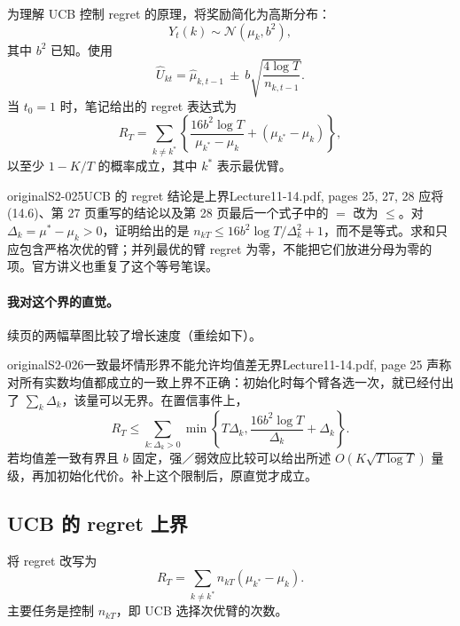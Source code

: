 为理解 UCB 控制 regret 的原理，将奖励简化为高斯分布：
\[
 Y_t(k)\sim\mathcal N(\mu_k,b^2),\tag{14.4}
\]
其中 $b^2$ 已知。使用
\[
 \widehat U_{kt}=\widehat\mu_{k,t-1}
 \ \pm\ b\sqrt{\frac{4\log T}{n_{k,t-1}}}.\tag{14.5}
\]
当 $t_0=1$ 时，笔记给出的 regret 表达式为
\[
 R_T=\sum_{k\ne k^*}
 \left\{\frac{16b^2\log T}{\mu_{k^*}-\mu_k}
 +(\mu_{k^*}-\mu_k)\right\},\tag{14.6}
\]
以至少 $1-K/T$ 的概率成立，其中 $k^*$ 表示最优臂。

\begin{reviewnote}{original}{S2-025}{UCB 的 regret 结论是上界}{Lecture11-14.pdf, pages 25, 27, 28}
应将 (14.6)、第 27 页重写的结论以及第 28 页最后一个式子中的 $=$ 改为 $\le$。对 $\Delta_k=\mu^*-\mu_k>0$，证明给出的是 $n_{kT}\le16b^2\log T/\Delta_k^2+1$，而不是等式。求和只应包含严格次优的臂；并列最优的臂 regret 为零，不能把它们放进分母为零的项。官方讲义也重复了这个等号笔误。
\end{reviewnote}


\paragraph{我对这个界的直觉。}

续页的两幅草图比较了增长速度（重绘如下）。

\begin{reviewnote}{original}{S2-026}{一致最坏情形界不能允许均值差无界}{Lecture11-14.pdf, page 25}
声称对所有实数均值都成立的一致上界不正确：初始化时每个臂各选一次，就已经付出了 $\sum_k\Delta_k$，该量可以无界。在置信事件上，
\[
 R_T\le\sum_{k:\Delta_k>0}\min\left\{T\Delta_k,\frac{16b^2\log T}{\Delta_k}+\Delta_k\right\}.
\]
若均值差一致有界且 $b$ 固定，强／弱效应比较可以给出所述 $O(K\sqrt{T\log T})$ 量级，再加初始化代价。补上这个限制后，原直觉才成立。
\end{reviewnote}


\subsection{UCB 的 regret 上界}
将 regret 改写为
\[
 R_T=\sum_{k\ne k^*}n_{kT}(\mu_{k^*}-\mu_k).
\]
主要任务是控制 $n_{kT}$，即 UCB 选择次优臂的次数。

